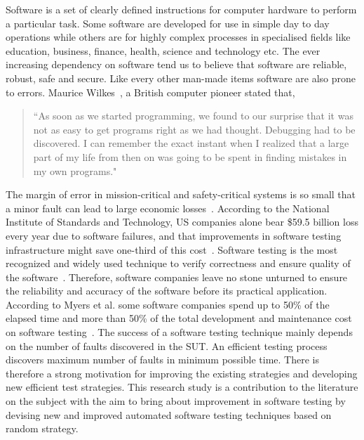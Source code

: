 Software is a set of clearly defined instructions for computer hardware to perform a particular task. Some software are developed for use in simple day to day operations while others are for highly complex processes in specialised fields like education, business, finance, health, science and technology etc. The ever increasing dependency on software tend us to believe that software are reliable, robust, safe and secure. Like every other man-made items software are also prone to errors. Maurice Wilkes~\cite{wilkes1985memoirs}, a British computer pioneer stated that,
\smallskip
\begin{quote}
``As soon as we started programming, we found to our surprise that it was not as easy to get programs right as we had thought. Debugging had to be discovered. I can remember the exact instant when I realized that a large part of my life from then on was going to be spent in finding mistakes in my own programs."
\end{quote}
\bigskip
The margin of error in mission-critical and safety-critical systems is so small that a minor fault can lead to large economic losses~\cite{huang2004securing}. According to the National Institute of Standards and Technology, US companies alone bear \$59.5 billion loss every year due to software failures, and that improvements in software testing infrastructure might save one-third of this cost~\cite{tassey2002economic}. Software testing is the most recognized and widely used technique to verify correctness and ensure quality of the software~\cite{patton2001software}. Therefore, software companies leave no stone unturned to ensure the reliability and accuracy of the software before its practical application. According to Myers et al. some software companies spend up to 50\% of the elapsed time and more than 50\% of the total development and maintenance cost on software testing~\cite{beizer2003software}. The success of a software testing technique mainly depends on the number of faults discovered in the SUT. An efficient testing process discovers maximum number of faults in minimum possible time. There is therefore a strong motivation for improving the existing strategies and developing new efficient test strategies. This research study is a contribution to the literature on the subject with the aim to bring about improvement in software testing by devising new and improved automated software testing techniques based on random strategy.

